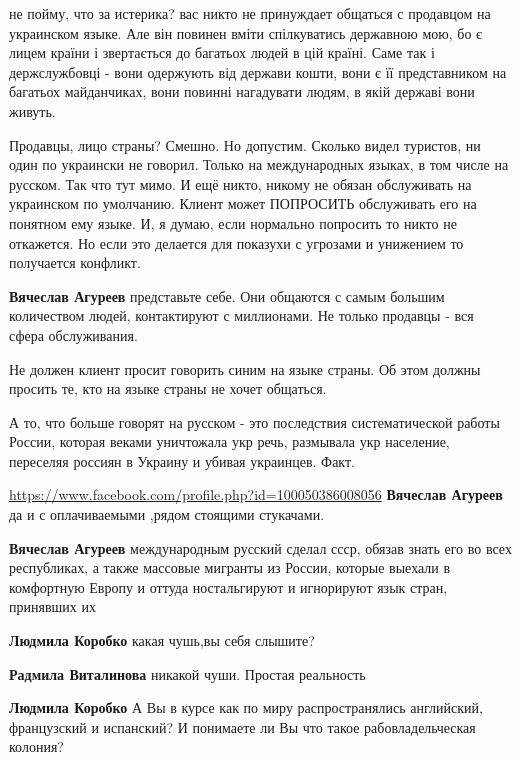 \begin{itemize}
не пойму, что за истерика? вас никто не принуждает общаться с продавцом на
украинском языке. Але він повинен вміти спілкуватись державною мою, бо є лицем
країни і звертається до багатьох людей в цій країні. Саме так і держслужбовці -
вони одержують від держави кошти, вони є її представником на багатьох
майданчиках, вони повинні нагадувати людям, в якій державі вони живуть.

\begin{itemize}

Продавцы, лицо страны? Смешно. Но допустим. Сколько видел туристов, ни один по
украински не говорил. Только на международных языках, в том числе на русском.
Так что тут мимо. И ещё никто, никому не обязан обслуживать на украинском по
умолчанию. Клиент может ПОПРОСИТЬ обслуживать его на понятном ему языке. И, я
думаю, если нормально попросить то никто не откажется. Но если это делается для
показухи с угрозами и унижением то получается конфликт.

\textbf{Вячеслав Агуреев} представьте себе. Они общаются с самым большим
количеством людей, контактируют с миллионами. Не только продавцы - вся сфера
обслуживания.

Не должен клиент просит говорить синим на языке страны. Об этом должны просить
те, кто на языке страны не хочет общаться.

А то, что больше говорят на русском - это последствия систематической работы
России, которая веками уничтожала укр речь, размывала укр население, переселяя
россиян в Украину и убивая украинцев. Факт.


\url{https://www.facebook.com/profile.php?id=100050386008056}
\textbf{Вячеслав Агуреев} да и с оплачиваемыми ,рядом стоящими стукачами.

\textbf{Вячеслав Агуреев} международным русский сделал ссср, обязав знать его во всех республиках, а также массовые мигранты из России, которые выехали в комфортную Европу и оттуда ностальгируют и игнорируют язык стран, принявших их

\textbf{Людмила Коробко} какая чушь,вы себя слышите?

\textbf{Радмила Виталинова} никакой чуши. Простая реальность

\textbf{Людмила Коробко} А Вы в курсе как по миру распространялись английский, французский и испанский? И понимаете ли Вы что такое рабовладельческая колония?


\end{itemize}
\end{itemize}
